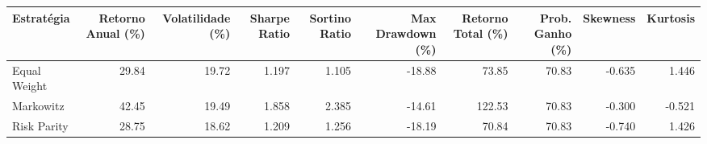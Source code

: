 \begin{tabular}{lrrrrrrrrr}
\toprule
Estratégia & Retorno Anual (\%) & Volatilidade (\%) & Sharpe Ratio & Sortino Ratio & Max Drawdown (\%) & Retorno Total (\%) & Prob. Ganho (\%) & Skewness & Kurtosis \\
\midrule
Equal Weight & 29.84 & 19.72 & 1.197 & 1.105 & -18.88 & 73.85 & 70.83 & -0.635 & 1.446 \\
Markowitz & 42.45 & 19.49 & 1.858 & 2.385 & -14.61 & 122.53 & 70.83 & -0.300 & -0.521 \\
Risk Parity & 28.75 & 18.62 & 1.209 & 1.256 & -18.19 & 70.84 & 70.83 & -0.740 & 1.426 \\
\bottomrule
\end{tabular}